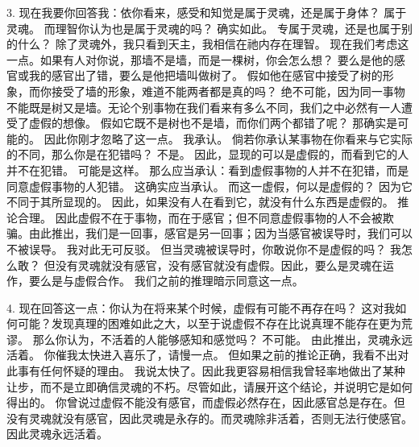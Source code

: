 3.  现在我要你回答我：依你看来，感受和知觉是属于灵魂，还是属于身体？ 属于灵魂。 而理智你认为也是属于灵魂的吗？ 确实如此。 专属于灵魂，还是也属于别的什么？ 除了灵魂外，我只看到天主，我相信在祂内存在理智。 现在我们考虑这一点。如果有人对你说，那墙不是墙，而是一棵树，你会怎么想？ 要么是他的感官或我的感官出了错，要么是他把墙叫做树了。 假如他在感官中接受了树的形象，而你接受了墙的形象，难道不能两者都是真的吗？ 绝不可能，因为同一事物不能既是树又是墙。无论个别事物在我们看来有多么不同，我们之中必然有一人遭受了虚假的想像。 假如它既不是树也不是墙，而你们两个都错了呢？ 那确实是可能的。 因此你刚才忽略了这一点。 我承认。 倘若你承认某事物在你看来与它实际的不同，那么你是在犯错吗？ 不是。 因此，显现的可以是虚假的，而看到它的人并不在犯错。 可能是这样。 那么应当承认：看到虚假事物的人并不在犯错，而是同意虚假事物的人犯错。 这确实应当承认。 而这一虚假，何以是虚假的？ 因为它不同于其所显现的。 因此，如果没有人在看到它，就没有什么东西是虚假的。 推论合理。 因此虚假不在于事物，而在于感官；但不同意虚假事物的人不会被欺骗。由此推出，我们是一回事，感官是另一回事；因为当感官被误导时，我们可以不被误导。 我对此无可反驳。 但当灵魂被误导时，你敢说你不是虚假的吗？ 我怎么敢？ 但没有灵魂就没有感官，没有感官就没有虚假。因此，要么是灵魂在运作，要么是与虚假合作。 我们之前的推理暗示同意这一点。\par

4.  现在回答这一点：你认为在将来某个时候，虚假有可能不再存在吗？ 这对我如何可能？发现真理的困难如此之大，以至于说虚假不存在比说真理不能存在更为荒谬。 那么你认为，不活着的人能够感知和感觉吗？ 不可能。 由此推出，灵魂永远活着。 你催我太快进入喜乐了，请慢一点。 但如果之前的推论正确，我看不出对此事有任何怀疑的理由。 我说太快了。因此我更容易相信我曾轻率地做出了某种让步，而不是立即确信灵魂的不朽。尽管如此，请展开这个结论，并说明它是如何得出的。 你曾说过虚假不能没有感官，而虚假必然存在，因此感官总是存在。但没有灵魂就没有感官，因此灵魂是永存的。而灵魂除非活着，否则无法行使感官。因此灵魂永远活着。\par

